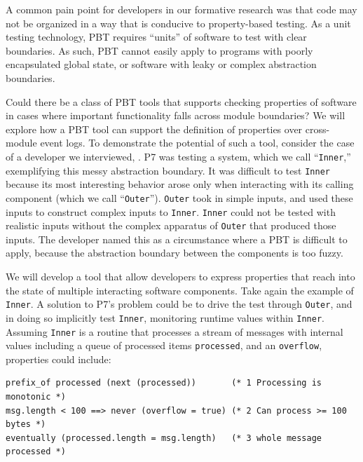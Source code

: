 A common pain point for developers in our formative research
was that code may not be organized in a way that is conducive to property-based
testing. As a unit testing technology, PBT requires ``units'' of software to
test with clear boundaries. As such, PBT cannot easily apply to programs with
poorly encapsulated global state, or software with leaky or complex abstraction
boundaries.

Could there be a class of PBT tools that supports checking properties of
software in cases where important functionality falls across module boundaries?
We will explore how a PBT tool can support the definition of properties over
cross-module event logs. To demonstrate the potential of such a tool, consider
the case of a developer we interviewed, . P7 was testing
a system, which we call ``\lstinline{Inner},'' exemplifying this messy
abstraction
boundary. It was difficult to test \lstinline{Inner} because
its most interesting behavior arose only when interacting with its calling
component (which we call ``\lstinline{Outer}'').
\lstinline{Outer} took in simple inputs, and used these inputs to construct
complex inputs to \lstinline{Inner}. \lstinline{Inner} could not be tested with
realistic inputs without the complex apparatus of \lstinline{Outer} that
produced those inputs. The developer named this as a circumstance where a
PBT is difficult to apply, because the abstraction boundary between the
components is too fuzzy.

We will develop a tool that allow developers to express properties that reach
into the state of multiple interacting software components. Take again the
example of \lstinline{Inner}. A solution to P7's problem could be to drive the
test through \lstinline{Outer}, and in doing so implicitly test
\lstinline{Inner}, monitoring runtime values within \lstinline{Inner}. Assuming
\lstinline{Inner} is a routine that processes a stream of messages with internal
values including a queue of processed items \lstinline{processed}, and an
\lstinline{overflow}, properties could include:

\begin{lstlisting}
prefix_of processed (next (processed))       (* 1 Processing is monotonic *)
msg.length < 100 ==> never (overflow = true) (* 2 Can process >= 100 bytes *)
eventually (processed.length = msg.length)   (* 3 whole message processed *)
\end{lstlisting}

